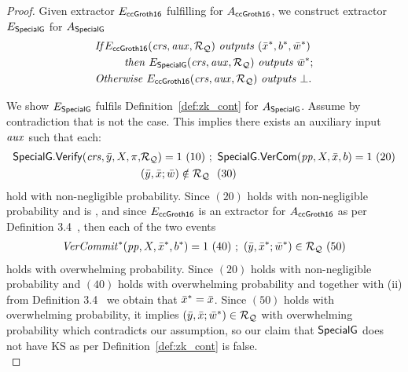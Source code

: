 \begin{proof}
\noindent Given extractor $E_{{\mathsf{ccGroth16}}}$ fulfilling  for $A_{{\mathsf{ccGroth16}}}$, we
construct extractor $E_{{\mathsf{SpecialG}}}$ for $A_{{\mathsf{SpecialG}}}$
\begin{align*}
&\mathit{If} E_{\ccgroth} (\crs, \realaux, \relRQ)\ \mathit{outputs} \ (\barx^*, b^*, \baromega^*) \\
& \ \ \ \ \ \ \ \ \mathit{then} \ E_{\SpecialG} (\crs, \realaux, \relRQ) \ \mathit{outputs} \ \baromega^*; \\
& \mathit{Otherwise} \ E_{\ccgroth}(\crs, \realaux, \relRQ) \ \mathit{outputs} \ \bot.
\end{align*}

We show $E_{{\mathsf{SpecialG}}}$ fulfils Definition~\ref{def:zk_cont} for $A_{{\mathsf{SpecialG}}}$. Assume by contradiction that is not the case. 
This implies there exists an auxiliary input $\mathit{aux}$ such that each: 
\begin{align*}
\SpecialG.\Verify(\crs, \bary, X, \pi, &\relRQ) =1 \ (10)\ ; \ \SpecialG.\VerifyCom(\pp, X, \barx, b) =1 \ (20) \\
& (\bary, \barx; \baromega) \notin \relRQ  \ \ (30) 
\end{align*}
hold with non-negligible probability. Since $(20)$ holds with non-negligible probability and  is , and since $E_{{\mathsf{ccGroth16}}}$ is an extractor for $A_{{\mathsf{ccGroth16}}}$ as per Definition 3.4~\cite{LegoSNARK},
 then each of the two events 
\begin{align*}
\mathit{VerCommit^*}(\mathit{pp}, X, \bar{x}^*, b^*) =1 \ (40) \ ; \ (\bar{y}, \bar{x}^*; \bar{w}^*) \in  \mathcal{R}_{\mathcal{Q}} \ (50)
\end{align*}
holds with overwhelming probability. Since $(20)$ holds with non-negligible probability and $(40)$ holds with overwhelming probability and 
together with (ii) from Definition 3.4~\cite{LegoSNARK} we obtain that $\bar{x}^* = \bar{x}$. Since $(50)$ holds with overwhelming probability, it implies 
$(\bar{y}, \bar{x}; \bar{w}^*) \in \mathcal{R}_{\mathcal{Q}} $ with overwhelming probability which contradicts our assumption, so our claim that ${\mathsf{SpecialG}}$ does not have 
KS as per Definition~\ref{def:zk_cont} is false. \\


\end{proof}
